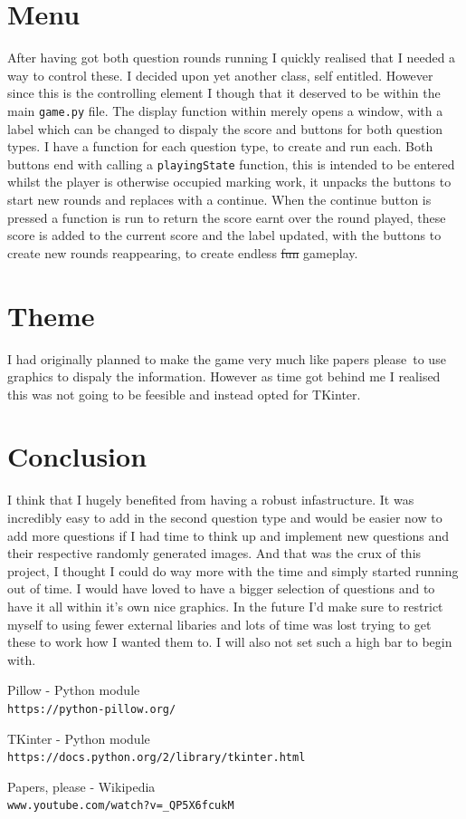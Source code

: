 \documentclass[twocolumn]{article}   %
\begin{document}
\section{Menu}
After having got both question rounds running I quickly realised that I needed a way to control these. I decided upon yet another class, self entitled. However since this is the controlling element I though that it deserved to be within the main \texttt{game.py} file. The display function within merely opens a window, with a label which can be changed to dispaly the score and buttons for both question types. I have a function for each question type, to create and run each. Both buttons end with calling a \texttt{playingState} function, this is intended to be entered whilst the player is otherwise occupied marking work, it unpacks the buttons to start new rounds and replaces with a continue. When the continue button is pressed a function is run to return the score earnt over the round played, these score is added to the current score and the label updated, with the buttons to create new rounds reappearing, to create endless \st{fun} gameplay.

\section{Theme}
I had originally planned to make the game very much like papers please\, to use graphics to dispaly the information. However as time got behind me I realised this was not going to be feesible and instead opted for TKinter.

\section{Conclusion}
I think that I hugely benefited from having a robust infastructure. It was incredibly easy to add in the second question type and would be easier now to add more questions if I had time to think up and implement new questions and their respective randomly generated images. And that was the crux of this project, I thought I could do way more with the time and simply started running out of time. I would have loved to have a bigger selection of questions and to have it all within it's own nice graphics. In the future I'd make sure to restrict myself to using fewer external libaries and lots of time was lost trying to get these to work how I wanted them to. I will also not set such a high bar to begin with.

\begin{thebibliography}{9}

  Pillow - Python module
  \\\texttt{https://python-pillow.org/}

  TKinter - Python module
  \\\texttt{https://docs.python.org/2/library/tkinter.html}

  Papers, please - Wikipedia
  \\\texttt{www.youtube.com/watch?v=\_QP5X6fcukM}

\end{thebibliography}


\end{document}
